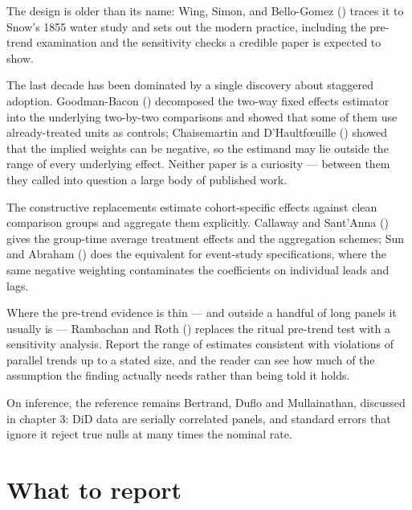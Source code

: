 \documentclass[
  letterpaper,
  10pt,
  twoside,
  openright,
  numbers=noenddot,
  chapterprefix=true]{scrbook}
\begin{document}
\begin{qmiblit}

The design is older than its name: Wing, Simon, and Bello-Gomez
() traces it to Snow's 1855 water study and
sets out the modern practice, including the pre-trend examination and
the sensitivity checks a credible paper is expected to show.

The last decade has been dominated by a single discovery about staggered
adoption. Goodman-Bacon ()
decomposed the two-way fixed effects estimator into the underlying
two-by-two comparisons and showed that some of them use already-treated
units as controls; Chaisemartin and D'Haultfœuille
() showed that the implied
weights can be negative, so the estimand may lie outside the range of
every underlying effect. Neither paper is a curiosity --- between them
they called into question a large body of published work.

The constructive replacements estimate cohort-specific effects against
clean comparison groups and aggregate them explicitly. Callaway and
Sant'Anna () gives the group-time
average treatment effects and the aggregation schemes; Sun and Abraham
() does the equivalent for event-study
specifications, where the same negative weighting contaminates the
coefficients on individual leads and lags.

Where the pre-trend evidence is thin --- and outside a handful of long
panels it usually is --- Rambachan and Roth
() replaces the ritual pre-trend test
with a sensitivity analysis. Report the range of estimates consistent
with violations of parallel trends up to a stated size, and the reader
can see how much of the assumption the finding actually needs rather
than being told it holds.

On inference, the reference remains Bertrand, Duflo and Mullainathan,
discussed in chapter 3: DiD data are serially correlated panels, and
standard errors that ignore it reject true nulls at many times the
nominal rate.

\end{qmiblit}

\section{What to report}\label{what-to-report-9}
\end{document}

